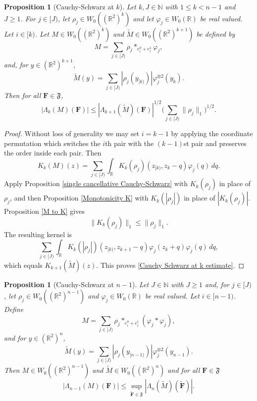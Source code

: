 \documentclass[12pt,reqno]{amsart}
\theoremstyle{plain}
\newtheorem{proposition}[theorem]{Proposition}
\numberwithin{equation}{section}
\theoremstyle{remark}
\newcommand{\using}[1]{}
\newcommand{\R}{{\mathbb R}}
\newcommand{\N}{{\mathbb N}}
\newcommand{\F}{\mathbf{F}}
\begin{document}
\begin{proposition}[Cauchy-Schwarz at $k$]\label{Cauchy-Schwarz at k}\using{single cancellative Cauchy-Schwarz}\using{Monotonicity K}\using{M to K}
Let $k,J\in\N$ with $1\le k<n-1$ and $J\ge1$. For $j\in[J)$, let $\rho_j\in W_0((\R^2)^k)$ and let $\varphi_j\in W_0(\R)$ be real valued. Let $i\in[k)$. Let $M\in W_0((\R^2)^k)$ and $\widetilde M\in W_0((\R^2)^{k+1})$ be defined by
\begin{equation}\label{before CS}
M=\sum_{j\in[J)}\rho_j*_{e_i^0+e_i^1}\varphi_j,
\end{equation}
and, for $y\in(\R^2)^{k+1}$,
\begin{equation}\label{Cauchy Schwarz tilde M definition}
\widetilde M(y)=\sum_{j\in[J)}|\rho_j(y_{[k)})|\varphi_j^{\otimes2}(y_k).
\end{equation}
Then for all $\F\in\mathfrak F$,
\begin{equation}\label{Cauchy Schwarz at k estimate}
|\Lambda_k(M)(\F)|
\le
|\Lambda_{k+1}(\widetilde M)(\F)|^{1/2}
\Big(\sum_{j\in[J)}\|\rho_j\|_1\Big)^{1/2}.
\end{equation}
\end{proposition}
\begin{proof}
Without loss of generality we may set $i=k-1$ by applying the coordinate permutation which switches the $i$th pair with the $(k-1)$st pair and preserves the order inside each pair. Then
\[
K_k(M)(z)
=
\sum_{j\in[J)}\int_\R K_k(\rho_j)(z_{[k)},z_k-q)\varphi_j(q)\,dq.
\]
Apply Proposition \ref{single cancellative Cauchy-Schwarz} with $K_k(\rho_j)$ in place of $\rho_j$, and then Proposition \ref{Monotonicity K} with $K_k(|\rho_j|)$ in place of $|K_k(\rho_j)|$. Proposition \ref{M to K} gives
\[
\|K_k(\rho_j)\|_1\le\|\rho_j\|_1.
\]
The resulting kernel is
\[
\sum_{j\in[J)}\int_\R
K_k(|\rho_j|)(z_{[k)},z_{k+1}-q)
\varphi_j(z_k+q)\varphi_j(q)\,dq,
\]
which equals $K_{k+1}(\widetilde M)(z)$. This proves \eqref{Cauchy Schwarz at k estimate}.
\end{proof}


\begin{proposition}[Cauchy-Schwarz at $n-1$]\label{Cauchy-Schwarz at n-1}\using{doubly cancellative Cauchy-Schwarz}\using{Monotonicity K}
Let $J\in\N$ with $J\ge1$ and, for $j\in [J)$, let
$\rho_j\in W_0((\R^2)^{n-1})$  and $\varphi_j\in W_0(\R)$ be real valued.
Let $i \in [n-1)$.
Define
\begin{equation}\label{before CS 2}
    M=\sum_{j\in [J)} \rho_j *_{e_i^0+e_i^1} (\varphi_j * \varphi_j),
\end{equation}
and for $y\in (\R^2)^n$,
\begin{equation}\label{auto:terminal-prism-majorant-kernel}
    \tilde{M}(y)=\sum_{j\in [J)} |\rho_j(y_{[n-1)})| \varphi_j^{\otimes 2}(y_{n-1}).
\end{equation}
Then $M\in W_0((\R^2)^{n-1})$ and $\tilde{M}\in W_0((\R^2)^n)$ and for all $\F\in\mathfrak{F}$
\begin{equation}\label{auto:terminal-prism-majorant-bound}
|\Lambda_{n-1}(M)(\F)| \le \sup_{\mathbf{\tilde{F}}\in\mathfrak{F}}|\Lambda_{n}(\tilde{M})(\mathbf{\tilde{F}})|.
\end{equation}
\end{proposition}
\end{document}
